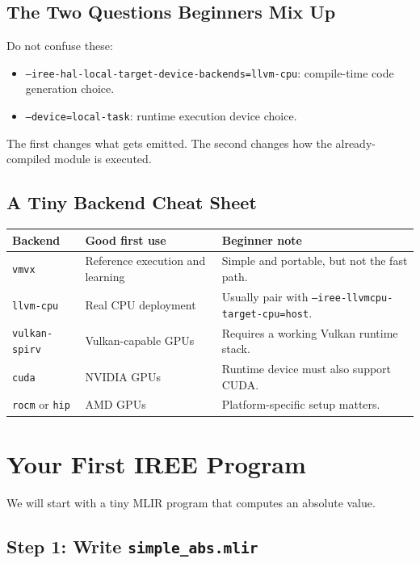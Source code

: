 \documentclass[11pt,a4paper]{article}
\begin{document}
\subsection{The Two Questions Beginners Mix Up}

Do not confuse these:
\begin{itemize}
    \item \texttt{--iree-hal-local-target-device-backends=llvm-cpu}: compile-time code generation choice.
    \item \texttt{--device=local-task}: runtime execution device choice.
\end{itemize}

The first changes what gets emitted. The second changes how the already-compiled module is executed.

\subsection{A Tiny Backend Cheat Sheet}

\begin{tabular}{|l|p{3.1cm}|p{6cm}|}
\hline
\textbf{Backend} & \textbf{Good first use} & \textbf{Beginner note} \\
\hline
\texttt{vmvx} & Reference execution and learning & Simple and portable, but not the fast path. \\
\hline
\texttt{llvm-cpu} & Real CPU deployment & Usually pair with \texttt{--iree-llvmcpu-target-cpu=host}. \\
\hline
\texttt{vulkan-spirv} & Vulkan-capable GPUs & Requires a working Vulkan runtime stack. \\
\hline
\texttt{cuda} & NVIDIA GPUs & Runtime device must also support CUDA. \\
\hline
\texttt{rocm} or \texttt{hip} & AMD GPUs & Platform-specific setup matters. \\
\hline
\end{tabular}

\section{Your First IREE Program}

We will start with a tiny MLIR program that computes an absolute value.

\subsection{Step 1: Write \texttt{simple\_abs.mlir}}
\end{document}

